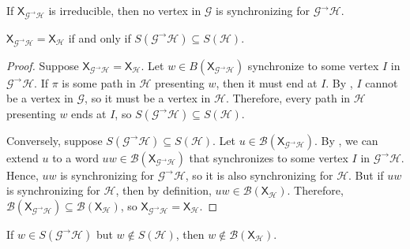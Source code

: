 \documentclass[hidelinks]{article}
\newcommand{\Gc}{\mathcal{G}}  %
\newcommand{\Hc}{\mathcal{H}}  %
\newcommand{\Bc}{\mathcal{B}}
\newcommand{\GtH}{{\Gc^\to\Hc}}
\newcommand{\shift}[1]{\mathsf{X}_{#1}}
\theoremstyle{definition}
\begin{document}
\begin{corollary}\label{nogsync}
    If \(\shift{\GtH}\) is irreducible, then no vertex in \(\Gc\) is synchronizing for \(\GtH\).
\end{corollary}


\begin{theorem}
    \(\shift{\GtH} = \shift{\Hc}\) if and only if \(S(\GtH) \subseteq S(\Hc)\).
\end{theorem}

\begin{proof}
    Suppose \(\shift{\GtH} = \shift{\Hc}\). Let \(w \in B(\shift{\GtH})\) synchronize to some vertex \(I\)
    in \(\GtH\).
    If \(\pi\) is some path in \(\Hc\) presenting \(w\), then it must end at \(I\). By 
    , \(I\) cannot be a vertex in \(\Gc\), so it must be a vertex in \(\Hc\).
    Therefore, every path in \(\Hc\) presenting \(w\) ends at \(I\), so \(S(\GtH) \subseteq S(\Hc)\).

    Conversely, suppose \(S(\GtH) \subseteq S(\Hc)\). Let \(u \in \Bc(\shift{\GtH})\).
    By , we can extend \(u\) to a word \(uw \in \Bc(\shift{\GtH})\) that 
    synchronizes to some vertex \(I\) in \(\GtH\). Hence, \(uw\) is synchronizing 
    for \(\GtH\), so it is also synchronizing for \(\Hc\). But if \(uw\) is synchronizing for
    \(\Hc\), then by definition, \(uw \in \Bc(\shift{\Hc})\). Therefore, \(\Bc(\shift{\GtH}) \subseteq \Bc(\shift{\Hc})\),
    so \(\shift{\GtH} = \shift{\Hc}\).
\end{proof}

\begin{proposition}
    If \(w \in S(\GtH)\) but \(w \notin S(\Hc)\), then \(w \notin \Bc(\shift{\Hc})\). 
\end{proposition}
\end{document}
